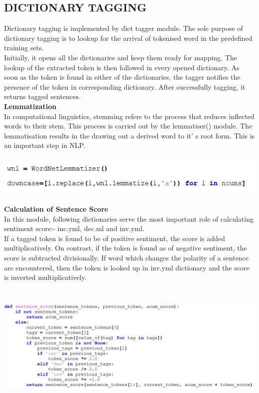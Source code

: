\documentclass[a4paper,12pt]{report}
\begin{document}
\subsection{DICTIONARY TAGGING}
\hspace*{\parindent} Dictionary tagging is implemented by dict tagger module. The sole purpose of dictionary tagging is to lookup for the arrival of tokenised word in the predefined training sets.\\
\hspace*{\parindent} Initially, it opens all the dictionaries and keep them ready for mapping. The lookup of the extracted token is then followed in every opened dictionary. As soon as the token is found in either of the dictionaries, the tagger notifies the presence of the token in corresponding dictionary. After successfully tagging, it returns tagged sentences.\\ 
\textbf{Lemmatization }\\ 
\hspace*{\parindent}	In computational linguistics, stemming refers to the process that reduces inflected words to their stem. This process is carried out by the lemmatiser() module. The lemmatisation results in the drawing out a derived word to it’ s root form. This is an important step in NLP.
\begin{center}
	\includegraphics[height=2cm]{images/codelemmatize.jpg}
\end{center}
\textbf{Calculation of Sentence Score }\\ 
\hspace*{\parindent}In this module, following dictionaries serve the most important role of calculating sentiment score:- inc.yml, dec.ml and inv.yml.\\
\hspace*{\parindent}If a tagged token is found to be of positive sentiment, the score is added multiplicatively. On contrast, if the token is found as of negative sentiment, the score is subtracted divisionally. If word  which changes the polarity of a sentence are encountered, then the token is looked up in inv.yml dictionary and the score is inverted multiplicatively.
\begin{center}
	\includegraphics[height=6cm]{images/SentenceScoreModule.jpg}
\end{center}
\end{document}

